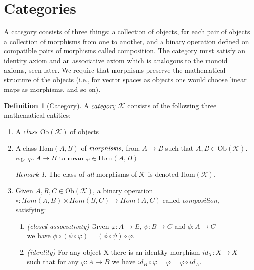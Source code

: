 \documentclass[10pt, oneside, reqno]{amsart}
\theoremstyle{plain}%
\theoremstyle{definition}
\newtheorem{defn}[thm]{Definition}
\theoremstyle{remark}
\newtheorem*{rem}{Remark}
\newcommand{\Cat}{\mathcal{K}}
\newcommand{\Id}{\mathit{id}_}
\begin{document}
\section{Categories} %
\label{sec:categories}
A category consists of three things:
a collection of objects, for each pair of objects a collection of morphisms from one to another, and a binary
operation defined on compatible pairs of morphisms called composition. The category must satisfy an identity axiom
and an associative axiom which is analogous to the monoid axioms, seen later. We require that morphisms preserve the
mathematical structure of the objects (i.e., for vector spaces as objects one would choose linear maps as morphisms, and so on).
\begin{defn}[Category]
	A $\emph{category}$ $\Cat$ consists of the following three mathematical entities:
	\begin{enumerate}
		\item A $\emph{class}$ $\text{Ob}(\Cat)$ of objects
		
		\item A class $\text{Hom}(A,B)$ of $\emph{morphisms}$, from $A \longrightarrow B$ such that $A, B \in \text{Ob}(\Cat)$.
		\\
		e.g. $\varphi : A \to B$ to mean $\varphi \in \text{Hom}(A,B)$.
		\begin{rem}
		The class of \emph{all} morphisms of $\Cat$ is denoted $\text{Hom}(\Cat)$.
		\end{rem}

		\item Given $A, B, C \in \text{Ob}(\Cat)$, a binary operation $\circ : Hom(A,B) \times Hom(B,C) \to Hom(A,C)$ called \emph{composition},
		satisfying:
		\begin{enumerate}
			\item \emph{(closed associativity)} Given $\varphi : A \to B$, $\psi: B \to C$ and $\phi: A \to C$
			\\
			we have $\phi \circ (\psi \circ \varphi) = (\phi \circ \psi) \circ \varphi$.
			\\
			
			\item \emph{(identity)} For any object X there is an identity morphism $\Id{X} : X \to X$ such that for any $\varphi: A \to B$ we have $\Id{B} \circ \varphi = \varphi = \varphi \circ \Id{A}$.
			\\
		\end{enumerate}
	\end{enumerate}
\end{defn}
\end{document}
